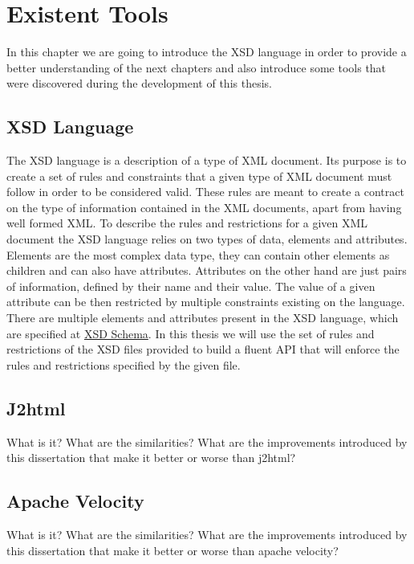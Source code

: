\chapter{Existent Tools}
\label{cha:tools}

In this chapter we are going to introduce the \ac{XSD} language in order to provide a better understanding of the next chapters and also introduce some tools that were discovered during the development of this thesis. 

\section{XSD Language} %
\label{sec:xsd}

The \ac{XSD} language is a description of a type of \ac{XML} document. Its purpose is to create a set of rules and constraints that a given type of \ac{XML} document must follow in order to be considered valid. These rules are meant to create a contract on the type of information contained in the \ac{XML} documents, apart from having well formed \ac{XML}. To describe the rules and restrictions for a given \ac{XML} document the \ac{XSD} language relies on two types of data, elements and attributes. Elements are the most complex data type, they can contain other elements as children and can also have attributes. Attributes on the other hand are just pairs of information, defined by their name and their value. The value of a given attribute can be then restricted by multiple constraints existing on the language. There are multiple elements and attributes present in the \ac{XSD} language, which are specified at \href{http://www.datypic.com/sc/xsd/s-xmlschema.xsd.html}{XSD Schema}. In this thesis we will use the set of rules and restrictions of the \ac{XSD} files provided to build a fluent \ac{API} that will enforce the rules and restrictions specified by the given file.

\section{J2html} %
\label{sec:j2html}

What is it? What are the similarities? What are the improvements introduced by this dissertation that make it better or worse than j2html?

\section{Apache Velocity} %
\label{sec:apachevelocity}

What is it? What are the similarities? What are the improvements introduced by this dissertation that make it better or worse than apache velocity?
